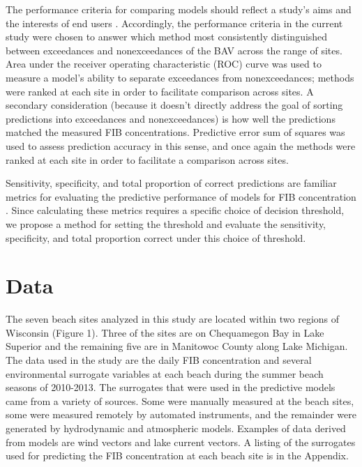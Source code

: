 \documentclass[authoryear,review, 12pt]{elsarticle}
\begin{document}
The performance criteria for comparing models should reflect a study's aims and the interests of end users \citep{Jakeman-Letcher-Norton-2006,Bennett-Croke-Guariso-Guillaume-Hamilton-Jakeman-Marsili-Libelli-Newham-Norton-Perrin-Pierce-Robson-Seppelt-Voinov-Fath-Andreassian-2013}. Accordingly, the performance criteria in the current study were chosen to answer which method most consistently distinguished between exceedances and nonexceedances of the BAV across the range of sites. Area under the receiver operating characteristic (ROC) curve was used to measure a model's ability to separate exceedances from nonexceedances; methods were ranked at each site in order to facilitate comparison across sites. A secondary consideration (because it doesn't directly address the goal of sorting predictions into exceedances and nonexceedances) is how well the predictions matched the measured FIB concentrations. Predictive error sum of squares was used to assess prediction accuracy in this sense, and once again the methods were ranked at each site in order to facilitate a comparison across sites.

Sensitivity, specificity, and total proportion of correct predictions are familiar metrics for evaluating the predictive performance of models for FIB concentration \citep{Thoe-Gold-Griesbach-Grimmer-Taggart-Boehm-2014}. Since calculating these metrics requires a specific choice of decision threshold, we propose a method for setting the threshold and evaluate the sensitivity, specificity, and total proportion correct under this choice of threshold.

\section{Data}\label{data}

The seven beach sites analyzed in this study are located within two
 regions of Wisconsin (Figure 1). Three of the
sites are on Chequamegon Bay in Lake Superior and the remaining five are
in Manitowoc County along Lake Michigan. The data used in the study are the daily FIB concentration and several environmental surrogate variables at each beach during the summer beach seasons of 2010-2013. The surrogates that were used in the predictive models came from a variety of sources. Some were manually measured at the beach sites, some were measured remotely by automated instruments, and the remainder were generated by hydrodynamic and atmospheric models. Examples of data derived from models are wind vectors and lake current vectors. A listing of the surrogates used for predicting the FIB concentration at each beach site is in the
Appendix.
\end{document}
